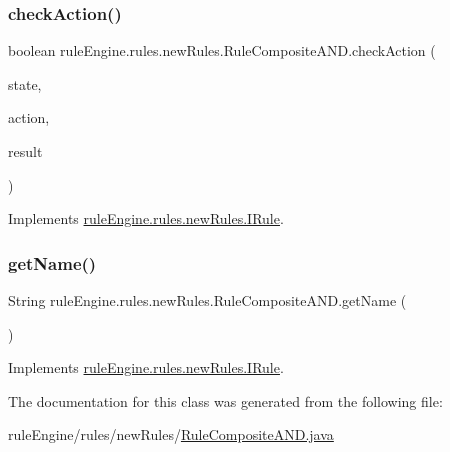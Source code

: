 \subsubsection{\texorpdfstring{check\+Action()}{checkAction()}}
{\footnotesize\ttfamily boolean rule\+Engine.\+rules.\+new\+Rules.\+Rule\+Composite\+A\+N\+D.\+check\+Action (\begin{DoxyParamCaption}\item[{\mbox{\hyperlink{classgame_1_1game_state_1_1_game_state}{Game\+State}}}]{state,  }\item[{\mbox{\hyperlink{classrule_engine_1_1_game_action}{Game\+Action}}}]{action,  }\item[{\mbox{\hyperlink{classrule_engine_1_1_rule_result}{Rule\+Result}}}]{result }\end{DoxyParamCaption})\hspace{0.3cm}{\ttfamily [inline]}}



Implements \mbox{\hyperlink{interfacerule_engine_1_1rules_1_1new_rules_1_1_i_rule_a72ce29a47d7a5fba75a09444a50a481e}{rule\+Engine.\+rules.\+new\+Rules.\+I\+Rule}}.

\mbox{\label{classrule_engine_1_1rules_1_1new_rules_1_1_rule_composite_a_n_d_a1807d41373e80bf5e2778e81a4148b7b}} 
\subsubsection{\texorpdfstring{get\+Name()}{getName()}}
{\footnotesize\ttfamily String rule\+Engine.\+rules.\+new\+Rules.\+Rule\+Composite\+A\+N\+D.\+get\+Name (\begin{DoxyParamCaption}{ }\end{DoxyParamCaption})\hspace{0.3cm}{\ttfamily [inline]}}



Implements \mbox{\hyperlink{interfacerule_engine_1_1rules_1_1new_rules_1_1_i_rule_a99e11d165ca863908c6e985a79917067}{rule\+Engine.\+rules.\+new\+Rules.\+I\+Rule}}.



The documentation for this class was generated from the following file\+:\begin{DoxyCompactItemize}
\item 
rule\+Engine/rules/new\+Rules/\mbox{\hyperlink{_rule_composite_a_n_d_8java}{Rule\+Composite\+A\+N\+D.\+java}}\end{DoxyCompactItemize}
